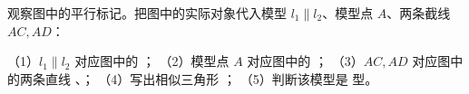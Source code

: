 \documentclass{exam-zh}
\begin{document}

\begin{problem}[points=10]
  \noindent
  \begin{minipage}[t]{\dimexpr\linewidth-60mm-6mm\relax}
    \vspace{0pt}
    观察图中的平行标记。把图中的实际对象代入模型 $l_1\parallel l_2$、模型点 $A$、两条截线 $AC,AD$：

（1）$l_1\parallel l_2$ 对应图中的 \underline{\hspace{2cm}}；
（2）模型点 $A$ 对应图中的 \underline{\hspace{1cm}}；
（3）$AC,AD$ 对应图中的两条直线 \underline{\hspace{1.8cm}}、\underline{\hspace{1.8cm}}；
（4）写出相似三角形 \underline{\hspace{4cm}}；
（5）判断该模型是 \underline{\hspace{1.5cm}} 型。


  \end{minipage}\hfill
  \begin{diagramcoltikz}{60mm}{第 4 题图}
  }
  \end{diagramcoltikz}
  \par\medskip
  \answerarea[34mm]
\end{problem}
\end{document}
